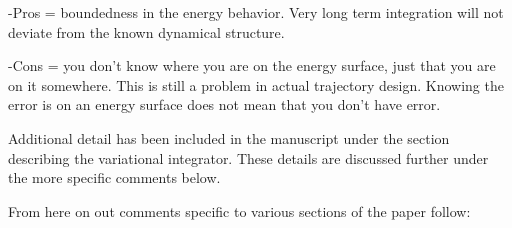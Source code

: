 \documentclass[11pt]{article}
\begin{document}
\begin{itemize}
\begin{itshape}
-Pros = boundedness in the energy behavior.  Very long term integration will not deviate from the known dynamical structure.

-Cons = you don't know where you are on the energy surface, just that you are on it somewhere.  This is still a problem in actual trajectory design.  Knowing the error is on an energy surface does not mean that you don't have error.
\end{itshape}

Additional detail has  been included in the manuscript under the section describing the variational integrator.
These details are discussed further under the more specific comments below.

\end{itemize}
From here on out comments specific to various sections of the paper follow:
\end{document}
